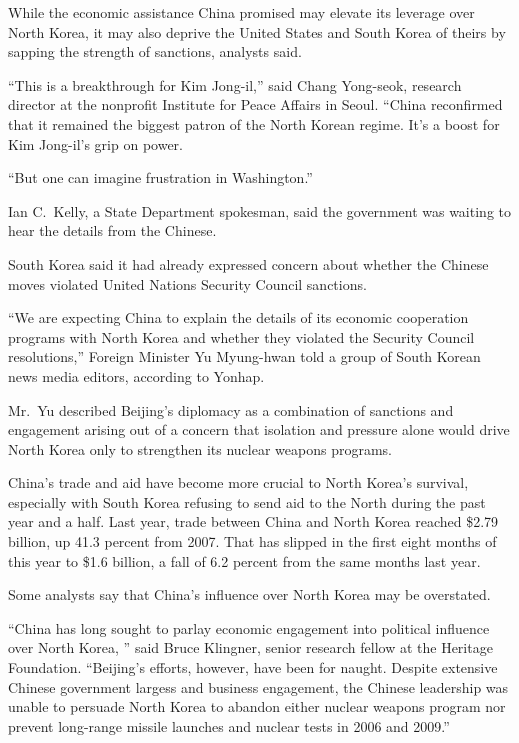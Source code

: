﻿\documentclass[12pt]{article}
\begin{document}
While the economic assistance China promised may elevate its leverage over North Korea, it may also
deprive the United States and South Korea of theirs by sapping the strength of sanctions, analysts
said.

``This is a breakthrough for Kim Jong-il,'' said Chang Yong-seok, research director at the nonprofit
Institute for Peace Affairs in Seoul. ``China reconfirmed that it remained the biggest patron of the
North Korean regime. It's a boost for Kim Jong-il's grip on power.

``But one can imagine frustration in Washington.''

Ian C.~Kelly, a State Department spokesman, said the government was waiting to hear the details from
the Chinese.

South Korea said it had already expressed concern about whether the Chinese moves violated United
Nations Security Council sanctions.

``We are expecting China to explain the details of its economic cooperation programs with North
Korea and whether they violated the Security Council resolutions,'' Foreign Minister Yu Myung-hwan
told a group of South Korean news media editors, according to Yonhap.

Mr.~Yu described Beijing's diplomacy as a combination of sanctions and engagement arising out of a
concern that isolation and pressure alone would drive North Korea only to strengthen its nuclear
weapons programs.

China's trade and aid have become more crucial to North Korea's survival, especially with South
Korea refusing to send aid to the North during the past year and a half. Last year, trade between
China and North Korea reached \$2.79 billion, up 41.3 percent from 2007. That has slipped in the
first eight months of this year to \$1.6 billion, a fall of 6.2 percent from the same months last
year.

Some analysts say that China's influence over North Korea may be overstated.

``China has long sought to parlay economic engagement into political influence over North Korea, ''
said Bruce Klingner, senior research fellow at the Heritage Foundation. ``Beijing's efforts,
however, have been for naught. Despite extensive Chinese government largess and business engagement,
the Chinese leadership was unable to persuade North Korea to abandon either nuclear weapons program
nor prevent long-range missile launches and nuclear tests in 2006 and 2009.''
\end{document}
